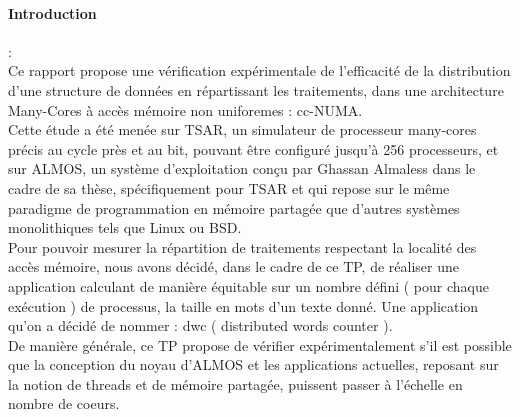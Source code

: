 \paragraph{Introduction}:\\

Ce rapport propose une vérification expérimentale de l'efficacité de la distribution d'une structure de données en répartissant les traitements, dans une architecture Many-Cores à accès mémoire non uniforemes : cc-NUMA.\\

Cette étude a été menée sur TSAR, un simulateur de processeur many-cores précis au cycle près et au bit, pouvant être configuré jusqu'à 256 processeurs, et sur ALMOS, un système d'exploitation conçu par Ghassan Almaless dans le cadre de sa thèse, spécifiquement pour TSAR et qui repose sur le même paradigme de programmation en mémoire partagée que d’autres systèmes monolithiques tels que Linux ou BSD.\\

Pour pouvoir mesurer la répartition de traitements respectant la localité des accès mémoire, nous avons décidé, dans le cadre de ce TP, de réaliser une application calculant de manière équitable sur un nombre défini ( pour chaque exécution ) de processus, la taille en mots d'un texte donné. Une application qu'on a décidé de nommer : dwc ( distributed words counter ).\\

De manière générale, ce TP propose de vérifier expérimentalement s’il est possible
que la conception du noyau d'ALMOS et les applications actuelles, reposant sur la notion de threads et de mémoire partagée, puissent passer à l’échelle en nombre de coeurs.\\

